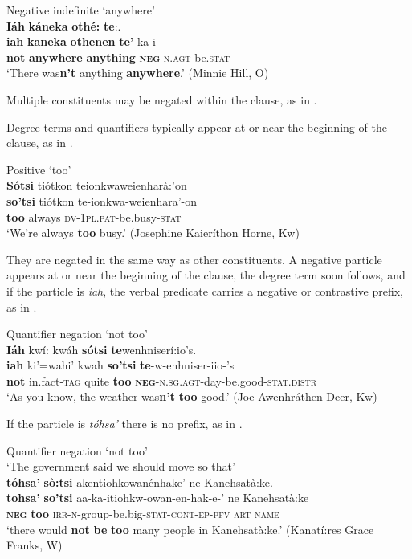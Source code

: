 \documentclass[output=paper,colorlinks,citecolor=brown]{langscibook}
\begin{document}
{
\ea\label{ex:moh:77}Negative indefinite ‘anywhere’\\
    \glll \textbf{Iáh} \textbf{káneka} \textbf{othé:} \textbf{te}:.\\
         \textbf{iah} \textbf{kaneka} \textbf{othenen} \textbf{te’}-ka-i\\
         \textbf{not} \textbf{anywhere} \textbf{anything} \textbf{\textsc{neg}}\textsc{-n.agt-}be.\textsc{stat}\\
    \glt ‘There was\textbf{n’t} anything \textbf{anywhere}.’ (Minnie Hill, O)
\z
}

Multiple constituents may be negated within the clause, as in .

Degree terms and quantifiers typically appear at or near the beginning of the clause, as in .

\ea\label{ex:moh:78}Positive ‘too’\\
    \glll \textbf{Sótsi} tiótkon teionkwaweienharà:’on \\
         \textbf{so’tsi} tiótkon te-ionkwa-weienhara’-on \\
         \textbf{too} always \textsc{dv-1pl.pat}-be.busy-\textsc{stat}\\
    \glt ‘We’re always \textbf{too} busy.’ (Josephine Kaieríthon Horne, Kw)
\z

They are negated in the same way as other constituents. A negative particle appears at or near the beginning of the clause, the degree term soon follows, and if the particle is \textit{iah}, the verbal predicate carries a negative or contrastive prefix, as in .

\ea\label{ex:moh:79}Quantifier negation ‘not too’\\
    \glll \textbf{Iáh} kwí: kwáh \textbf{sótsi} \textbf{te}wenhniserí:io’s.\\
         \textbf{iah} ki’=wahi’ kwah \textbf{so’tsi} \textbf{te}-w-enhniser-iio-’s\\
         \textbf{not} in.fact-\textsc{tag} quite \textbf{too} \textbf{\textsc{neg}}\textsc{-n.sg.agt-}day-be.good-\textsc{stat.distr}\\
    \glt ‘As you know, the weather was\textbf{n’t} \textbf{too} good.’ (Joe Awenhráthen Deer, Kw)
\z

If the particle is \textit{tóhsa’} there is no prefix, as in .

\ea\label{ex:moh:80}Quantifier negation ‘not too’\\
    \glt ‘The government said we should move so that’\\ 
    \medskip 
    \glll \textbf{tóhsa’} \textbf{sò:tsi} akentiohkowanénhake’ ne Kanehsatà:ke. \\ 
         \textbf{tohsa’} \textbf{so’tsi} aa-ka-itiohkw-owan-en-hak-e-’ ne Kanehsatà:ke \\
         \textbf{\textsc{neg}} \textbf{too} \textsc{irr-n-}group-be.big-\textsc{stat-cont-ep-pfv} \textsc{art} \textsc{name} \\
    \glt ‘there would \textbf{not} \textbf{be} \textbf{too} many people in Kanehsatà:ke.’ (Kanatí:res Grace Franks, W)
\z
\end{document}
